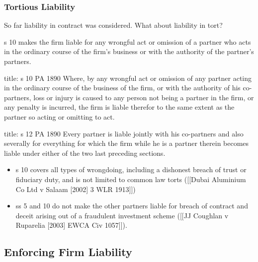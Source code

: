 \documentclass[
]{article}
\newenvironment{Shaded}{}{}
\newcommand{\NormalTok}[1]{#1}
\providecommand{\tightlist}{%
  \setlength{\itemsep}{0pt}\setlength{\parskip}{0pt}}
\begin{document}
\hypertarget{tortious-liability}{%
\subsubsection{Tortious Liability}\label{tortious-liability}}

So far liability in contract was considered. What about liability in
tort?

s 10 makes the firm liable for any wrongful act or omission of a partner
who acts in the ordinary course of the firm's business or with the
authority of the partner's partners.

\begin{Shaded}
\begin{Highlighting}[]
\NormalTok{title: s 10 PA 1890}
\NormalTok{Where, by any wrongful act or omission of any partner acting in the ordinary course of the business of the firm, or with the authority of his co{-}partners, loss or injury is caused to any person not being a partner in the firm, or any penalty is incurred, the firm is liable therefor to the same extent as the partner so acting or omitting to act.}
\end{Highlighting}
\end{Shaded}

\begin{Shaded}
\begin{Highlighting}[]
\NormalTok{title: s 12 PA 1890}
\NormalTok{Every partner is liable jointly with his co{-}partners and also severally for everything for which the firm while he is a partner therein becomes liable under either of the two last preceding sections. }
\end{Highlighting}
\end{Shaded}

\begin{itemize}
\tightlist
\item
  s 10 covers all types of wrongdoing, including a dishonest breach of
  trust or fiduciary duty, and is not limited to common law torts
  ({[}{[}Dubai Aluminium Co Ltd v Salaam {[}2002{]} 3 WLR 1913{]}{]})
\item
  ss 5 and 10 do not make the other partners liable for breach of
  contract and deceit arising out of a fraudulent investment scheme
  ({[}{[}JJ Coughlan v Ruparelia {[}2003{]} EWCA Civ 1057{]}{]}).
\end{itemize}

\hypertarget{enforcing-firm-liability}{%
\subsection{Enforcing Firm Liability}\label{enforcing-firm-liability}}
\end{document}
